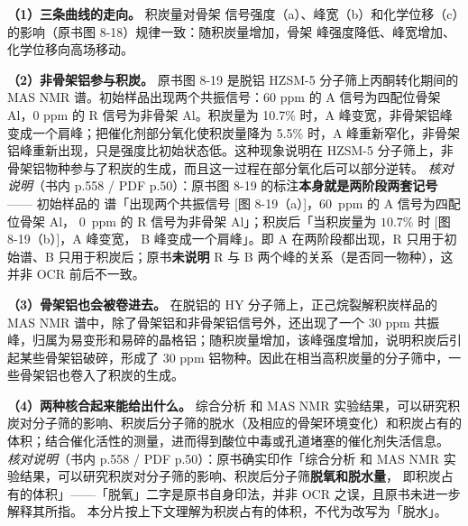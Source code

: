 \begin{dataflow}
\textbf{（1）三条曲线的走向。} 积炭量对骨架  信号强度（a）、峰宽（b）和化学位移（c）的影响（原书图 8-18）规律一致：随积炭量增加，骨架  峰强度降低、峰宽增加、化学位移向高场移动。

\textbf{（2）非骨架铝参与积炭。} 原书图 8-19 是脱铝 HZSM-5 分子筛上丙酮转化期间的  MAS NMR 谱。初始样品出现两个共振信号：60 ppm 的 A 信号为四配位骨架 Al，0 ppm 的 R 信号为非骨架 Al。积炭量为 10.7\% 时，A 峰变宽，非骨架铝峰变成一个肩峰；把催化剂部分氧化使积炭量降为 5.5\% 时，A 峰重新窄化，非骨架铝峰重新出现，只是强度比初始状态低。这种现象说明在 HZSM-5 分子筛上，非骨架铝物种参与了积炭的生成，而且这一过程在部分氧化后可以部分逆转。
\emph{核对说明}（书内 p.558 / PDF p.50）：原书图 8-19 的标注\textbf{本身就是两阶段两套记号}——
初始样品的  谱「出现两个共振信号 [图 8-19（a）]，\qty{60}{ppm} 的 A 信号为四配位骨架 Al，
\qty{0}{ppm} 的 R 信号为非骨架 Al」；积炭后「当积炭量为 $10.7\%$ 时 [图 8-19（b）]，A 峰变宽，
B 峰变成一个肩峰」。即 A 在两阶段都出现，R 只用于初始谱、B 只用于积炭后；原书\textbf{未说明} R 与 B
两个峰的关系（是否同一物种），这并非 OCR 前后不一致。

\textbf{（3）骨架铝也会被卷进去。} 在脱铝的 HY 分子筛上，正己烷裂解积炭样品的  MAS NMR 谱中，除了骨架铝和非骨架铝信号外，还出现了一个 30 ppm 共振峰，归属为易变形和易碎的晶格铝；随积炭量增加，该峰强度增加，说明积炭后引起某些骨架铝破碎，形成了 30 ppm 铝物种。因此在相当高积炭量的分子筛中，一些骨架铝也卷入了积炭的生成。

\textbf{（4）两种核合起来能给出什么。} 综合分析  和  MAS NMR 实验结果，可以研究积炭对分子筛的影响、积炭后分子筛的脱水（及相应的骨架环境变化）和积炭占有的体积；结合催化活性的测量，进而得到酸位中毒或孔道堵塞的催化剂失活信息。
\emph{核对说明}（书内 p.558 / PDF p.50）：原书确实印作「综合分析  和
 MAS NMR 实验结果，可以研究积炭对分子筛的影响、积炭后分子筛\textbf{脱氧和脱水量}，
即积炭占有的体积」——「脱氧」二字是原书自身印法，并非 OCR 之误，且原书未进一步解释其所指。
本分片按上下文理解为积炭占有的体积，不代为改写为「脱水」。
\end{dataflow}

